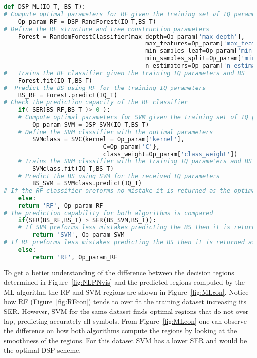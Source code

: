 \begin{lstlisting}[language=Python,caption=Machine learning enabled DSP scheme that  returns the best preforming ML algorithm and the optimal parameter for the training algorithm. ,label=lis:MLDSP]
def DSP_ML(IQ_T, BS_T):
# Compute optimal parameters for RF given the training set of IQ parameters
	Op_param_RF = DSP_RandForest(IQ_T,BS_T)
# Define the RF structure and tree construction parameters
	Forest = RandomForestClassifier(max_depth=Op_param['max_depth'],
										max_features=Op_param['max_features'],
										min_samples_leaf=Op_param['min_samples_leaf'],
										min_samples_split=Op_param['min_samples_split'],
										n_estimators=Op_param['n_estimators'])
#	Trains the RF classifier given the training IQ parameters and BS
	Forest.fit(IQ_T,BS_T)
#  Predict the BS using RF for the training IQ parameters
	BS_RF = Forest.predict(IQ_T)
# Check the prediction capacity of the RF classifier 
	if( SER(BS_RF,BS_T )> 0 ):
	# Compute optimal parameters for SVM given the training set of IQ parameters and BS
		Op_param_SVM = DSP_SVM(IQ_T,BS_T)
	# Define the SVM classifier with the optimal parameters 
		SVMclass = SVC(kernel = Op_param['kernel'],
							C=Op_param['C'},
							class_weight=Op_param['class_weight'])
	# Trains the SVM classifier with the training IQ parameters and BS      
		SVMclass.fit(IQ_T,BS_T)
	# Predict the BS using SVM for the received IQ parameters
		BS_SVM = SVMclass.predict(IQ_T)
# If the RF classifier preforms no mistake it is returned as the optimal classifier
	else:
   	return 'RF', Op_param_RF
# The prediction capability for both algorithms is compared 
	if(SER(BS_RF,BS_T) > SER(BS_SVM,BS_T)):
	# If SVM preforms less mistakes predicting the BS then it is returned as the optimal classifier
		return 'SVM', Op_param_SVM
# If RF preforms less mistakes predicting the BS then it is returned as the optimal classifier
	else:
		return 'RF', Op_param_RF
\end{lstlisting}	

To get a better understanding of the difference between the decision regions determined in Figure~\ref{fig:NLPNvis} and the predicted regions computed by the ML algorithm the RF and SVM regions are shown in Figure~\ref{fig:MLcon}. Notice how RF (Figure~\ref{fig:RFcon}) tends to over fit the training dataset increasing its SER. However, SVM for the same dataset finds optimal regions that do not over lap, predicting accurately all symbols. From Figure~\ref{fig:MLcon} one can observe the difference on how both algorithms compute the regions by looking at the smoothness of the regions. For this dataset SVM has a lower SER and would  be the optimal DSP scheme.

